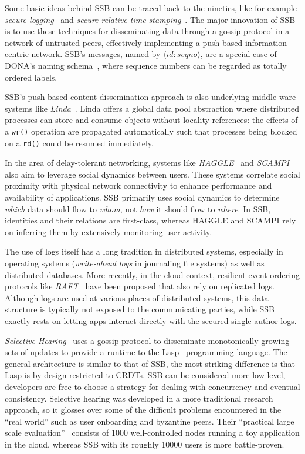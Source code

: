 \documentclass[9pt,sigconf]{acmart}
\begin{document}
Some basic ideas behind SSB can be traced back to the nineties, like
for example {\em secure logging}~\cite{schneier1998cryptographic} and {\em secure
relative time-stamping}~\cite{haber1990time}. The major innovation of
SSB is to use these techniques for disseminating data through a gossip
protocol in a network of untrusted peers, effectively implementing a
push-based information-centric network. SSB's messages, named by $\langle id:seqno\rangle$, are a special case of DONA's naming schema~\cite{Koponen:2007:DNA:1282380.1282402}, where sequence numbers can be regarded as totally ordered labels.

SSB's push-based content dissemination approach is also
underlying middle-ware systems like
{\em Linda}~\cite{Gelernter:1985:GCL:2363.2433}. Linda offers a global data
pool abstraction where distributed processes can store and consume
objects without locality references: the effects of a {\tt wr()}
operation are propagated automatically such that processes being
blocked on a {\tt rd()} could be resumed immediately.

In the area of delay-tolerant networking, systems like {\em HAGGLE}~\cite{scott2006haggle} and {\em SCAMPI}~\cite{pitkanen2012scampi} also aim to leverage social dynamics between users. These systems correlate social proximity with physical network connectivity to enhance performance and availability of applications. SSB primarily uses social dynamics to determine {\em which} data should flow to {\em whom}, not {\em how} it should flow to {\em where}. In SSB, identities and their relations are first-class, whereas HAGGLE and SCAMPI rely on inferring them by extensively monitoring user activity.

The use of logs itself has a long tradition in distributed systems,
especially in operating systems (\textit{write-ahead logs} in journaling file
systems) as well as distributed databases. More recently, in the cloud
context, resilient event ordering protocols like
{\em RAFT}~\cite{DBLP:conf/usenix/OngaroO14} have been proposed that also
rely on replicated logs. Although logs are used at various places of
distributed systems, this data structure is typically not exposed to
the communicating parties, while SSB exactly rests on letting apps
interact directly with the secured single-author logs.

\textit{Selective Hearing}~\cite{meiklejohn2015selective} uses a gossip protocol to disseminate monotonically growing sets of updates to provide a runtime to the Lasp~\cite{meiklejohn2015lasp} programming language. The general architecture is similar to that of SSB, the most striking difference is that Lasp is by design restricted to CRDTs. SSB can be considered more low-level, developers are free to choose a strategy for dealing with concurrency and eventual consistency. Selective hearing was developed in a more traditional research approach, so it glosses over some of the difficult problems encountered in the ``real world'' such as user onboarding and byzantine peers. Their ``practical large scale evaluation''~\cite{meiklejohn2017lasp} consists of 1000 well-controlled nodes running a toy application in the cloud, whereas SSB with its roughly 10000 users is more battle-proven.
\end{document}
